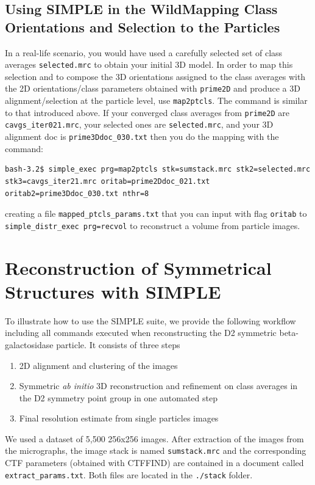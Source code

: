 \documentclass[a4paper,11pt]{article}
\newcommand{\prgname}[1]{\textcolor{NavyBlue}{\texttt{#1}}}
\begin{document}
\begin{tcolorbox}[breakable,colback=white,colframe=orange,width=\dimexpr\textwidth+12mm\relax,enlarge left by=-6mm]
\subsection{Using SIMPLE in the Wild\textemdash{}Mapping Class Orientations and Selection to the Particles}
In a real-life scenario, you would have used a carefully selected set of class averages \texttt{selected.mrc} to obtain your initial 3D model. In order to map this selection and to compose the 3D orientations assigned to the class averages with the 2D orientations/class parameters obtained with \prgname{prime2D} and produce a 3D alignment/selection at the particle level, use \prgname{map2ptcls}. The command is similar to that introduced above. If your converged class averages from \prgname{prime2D} are \texttt{cavgs\_iter021.mrc}, your selected ones are \texttt{selected.mrc}, and your 3D alignment doc is \texttt{prime3Ddoc\_030.txt} then you do the mapping with the command:
\begin{verbatim}
bash-3.2$ simple_exec prg=map2ptcls stk=sumstack.mrc stk2=selected.mrc
stk3=cavgs_iter21.mrc oritab=prime2Ddoc_021.txt oritab2=prime3Ddoc_030.txt nthr=8
\end{verbatim}
creating a file \texttt{mapped\_ptcls\_params.txt} that you can input with flag \texttt{oritab} to \texttt{simple\_distr\_exec prg=recvol} to reconstruct a volume from particle images.
\end{tcolorbox}

\section{Reconstruction of Symmetrical Structures with SIMPLE}
To illustrate how to use the SIMPLE suite, we provide the following workflow including all commands executed when reconstructing the D2 symmetric beta-galactosidase particle. It consists of three steps
\begin{enumerate}
\item 2D alignment and clustering of the images
\item Symmetric \textit{ab initio} 3D reconstruction and refinement on class averages in the D2 symmetry point group in one automated step
\item Final resolution estimate from single particles images
\end{enumerate}
We used a dataset of 5,500 256x256 images. After extraction of the images from the micrographs, the image stack is named \texttt{sumstack.mrc} and the corresponding CTF parameters (obtained with CTFFIND) are contained in a document called \texttt{extract\_params.txt}. Both files are located in the \texttt{./stack} folder.
\end{document}
